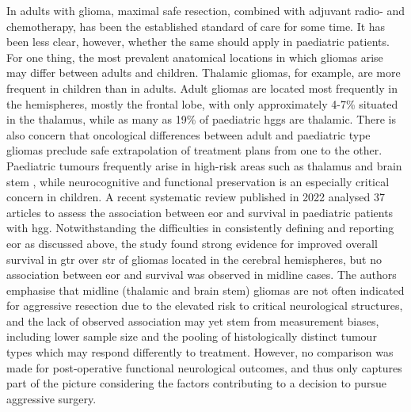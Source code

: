 In adults with glioma, maximal safe resection, combined with adjuvant radio- and chemotherapy, has been the established standard of care for some time.
It has been less clear, however, whether the same should apply in paediatric patients.
For one thing, the most prevalent anatomical locations in which gliomas arise may differ between adults and children\autocite{Duffau2004}.
Thalamic gliomas, for example, are more frequent in children than in adults\autocite{Cinalli2018,Palmisciano2021,GomezVecchio2021}.
Adult gliomas are located most frequently in the hemispheres, mostly the frontal lobe, with only approximately 4-7\%\autocite{GomezVecchio2021,Larjavaara2007} situated in the thalamus, while as many as 19\% of paediatric \glspl{hgg} are thalamic\autocite{McCrea2015}.
There is also concern that oncological differences between adult and paediatric type gliomas preclude safe extrapolation of treatment plans from one to the other\autocite{Jones2012,Greuter2021}.
Paediatric tumours frequently arise in high-risk areas such as thalamus and brain stem \autocite{Ostrom2015}, while neurocognitive and functional preservation is an especially critical concern in children.
A recent systematic review published in 2022 analysed 37 articles to assess the association between \gls{eor} and survival in paediatric patients with \gls{hgg}\autocite{Hatoum2022}.
Notwithstanding the difficulties in consistently defining and reporting \gls{eor} as discussed above, the study found strong evidence for improved overall survival in \gls{gtr} over \gls{str} of gliomas located in the cerebral hemispheres, but no association between \gls{eor} and survival was observed in midline cases.
The authors emphasise that midline (thalamic and brain stem) gliomas are not often indicated for aggressive resection due to the elevated risk to critical neurological structures, and the lack of observed association may yet stem from measurement biases, including lower sample size and the pooling of histologically distinct tumour types which may respond differently to treatment.
However, no comparison was made for post-operative functional neurological outcomes, and thus only captures part of the picture considering the factors contributing to a decision to pursue aggressive surgery.

